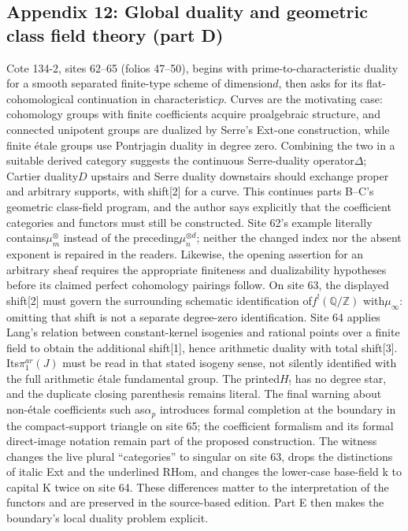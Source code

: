 \documentclass[10pt,oneside]{book}
\begin{document}
\subsection*{Appendix 12: Global duality and geometric class field theory (part D)}
Cote 134-2, sites 62--65 (folios 47--50), begins with prime-to-characteristic duality for a smooth separated finite-type scheme of dimension$d$, then asks for its flat-cohomological continuation in characteristic$p$. Curves are the motivating case: cohomology groups with finite coefficients acquire proalgebraic structure, and connected unipotent groups are dualized by Serre's Ext-one construction, while finite étale groups use Pontrjagin duality in degree zero. Combining the two in a suitable derived category suggests the continuous Serre-duality operator$\Delta$; Cartier duality$D$ upstairs and Serre duality downstairs should exchange proper and arbitrary supports, with shift[2] for a curve. This continues parts B--C's geometric class-field program, and the author says explicitly that the coefficient categories and functors must still be constructed. Site 62's example literally contains$\mu_m^{\otimes}$ instead of the preceding$\mu_n^{\otimes d}$; neither the changed index nor the absent exponent is repaired in the readers. Likewise, the opening assertion for an arbitrary sheaf requires the appropriate finiteness and dualizability hypotheses before its claimed perfect cohomology pairings follow. On site 63, the displayed shift[2] must govern the surrounding schematic identification of$f^!(\mathbb Q/\mathbb Z)$ with$\mu_\infty$: omitting that shift is not a separate degree-zero identification. Site 64 applies Lang's relation between constant-kernel isogenies and rational points over a finite field to obtain the additional shift[1], hence arithmetic duality with total shift[3]. Its$\pi_1^{ar}(J)$ must be read in that stated isogeny sense, not silently identified with the full arithmetic étale fundamental group. The printed$H_!$ has no degree star, and the duplicate closing parenthesis remains literal. The final warning about non-étale coefficients such as$\alpha_p$ introduces formal completion at the boundary in the compact-support triangle on site 65; the coefficient formalism and its formal direct-image notation remain part of the proposed construction. The witness changes the live plural ``categories'' to singular on site 63, drops the distinctions of italic Ext and the underlined RHom, and changes the lower-case base-field k to capital K twice on site 64. These differences matter to the interpretation of the functors and are preserved in the source-based edition. Part E then makes the boundary's local duality problem explicit.
\end{document}
